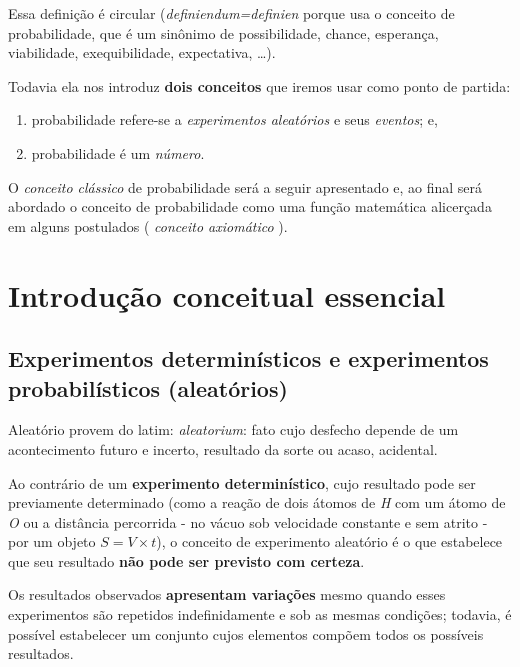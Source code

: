 \documentclass[
]{book}
\providecommand{\tightlist}{%
  \setlength{\itemsep}{0pt}\setlength{\parskip}{0pt}}
\begin{document}
Essa definição é circular (\emph{definiendum=definien} porque usa o conceito de probabilidade, que é um sinônimo de possibilidade, chance, esperança, viabilidade, exequibilidade, expectativa, \dots).

Todavia ela nos introduz \textbf{dois conceitos} que iremos usar como ponto de partida:

\begin{enumerate}
\def\labelenumi{\arabic{enumi}.}
\tightlist
\item
  probabilidade refere-se a \emph{experimentos aleatórios} e seus \emph{eventos}; e,
\item
  probabilidade é um \emph{número}.
\end{enumerate}

O \emph{conceito clássico} de probabilidade será a seguir apresentado e, ao final será abordado o conceito de probabilidade como uma função matemática alicerçada em alguns postulados ( \emph{conceito axiomático} ).

\hypertarget{introduuxe7uxe3o-conceitual-essencial-1}{%
\section{Introdução conceitual essencial}\label{introduuxe7uxe3o-conceitual-essencial-1}}

\hypertarget{experimentos-determinuxedsticos-e-experimentos-probabiluxedsticos-aleatuxf3rios}{%
\subsection{Experimentos determinísticos e experimentos probabilísticos (aleatórios)}\label{experimentos-determinuxedsticos-e-experimentos-probabiluxedsticos-aleatuxf3rios}}

Aleatório provem do latim: \emph{aleatorium}: fato cujo desfecho depende de um acontecimento futuro e incerto, resultado da sorte ou acaso, acidental.

\hfill\break

Ao contrário de um \textbf{experimento determinístico}, cujo resultado pode ser previamente determinado (como a reação de dois átomos de \emph{H} com um átomo de \emph{O} ou a distância percorrida - no vácuo sob velocidade constante e sem atrito - por um objeto \(S = V \times t\)), o conceito de experimento aleatório é o que estabelece que seu resultado \textbf{não pode ser previsto com certeza}.

Os resultados observados \textbf{apresentam variações} mesmo quando esses experimentos são repetidos indefinidamente e sob as mesmas condições; todavia, é possível estabelecer um conjunto cujos elementos compõem todos os possíveis resultados.
\end{document}
